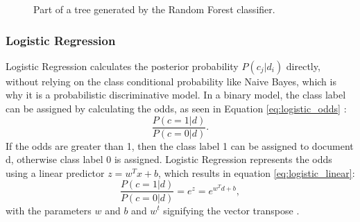         \begin{figure}
        \centering
    \caption{Part of a tree generated by the Random Forest classifier.}
      \label{fig:tree}
\end{figure}
\subsubsection{Logistic Regression}
Logistic Regression calculates the posterior probability $P(c_j|d_i)$ directly, without relying on the class conditional probability like Naive Bayes, which is why it is a probabilistic discriminative model. In a binary model, the class label can be assigned by calculating the odds, as seen in Equation \eqref{eq:logistic_odds} \cite{DBLP:books/aw/TanSKK2019}:
        \begin{equation}
            \label{eq:logistic_odds}
                \frac{P(c=1|d)}{P(c=0|d)}.
        \end{equation}
If the odds are greater than 1, then the class label 1 can be assigned to document d, otherwise class label 0 is assigned. Logistic Regression represents the odds using a linear predictor $z=w^Tx + b$, which results in equation \eqref{eq:logistic_linear}:
        \begin{equation}
            \label{eq:logistic_linear}
                \frac{P(c=1|d)}{P(c=0|d)} = e^z = e^{w^Td+b},
        \end{equation}
with the parameters $w$ and $b$ and $w^t$ signifying the vector transpose \cite{DBLP:books/aw/TanSKK2019}.

